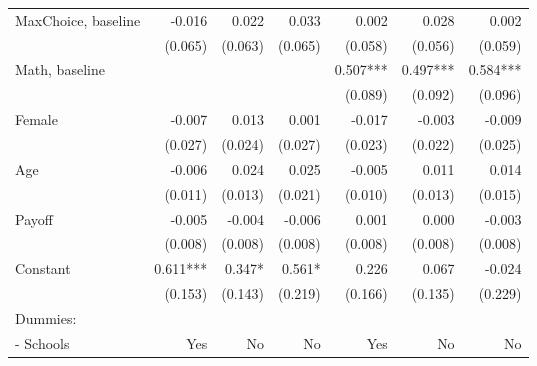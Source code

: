 \begin{table}[!h]
\begin{adjustbox}{width=1\textwidth}
\begin{threeparttable}
\begin{tabular}{l*{6}{D{.}{.}{-1}}}
\midrule
MaxChoice, baseline &              -0.016   &               0.022   &               0.033   &               0.002   &               0.028   &               0.002   \\
                    &             (0.065)   &             (0.063)   &             (0.065)   &             (0.058)   &             (0.056)   &             (0.059)   \\
Math, baseline      &                       &                       &                       &               0.507***&               0.497***&               0.584***\\
                    &                       &                       &                       &             (0.089)   &             (0.092)   &             (0.096)   \\
Female              &              -0.007   &               0.013   &               0.001   &              -0.017   &              -0.003   &              -0.009   \\
                    &             (0.027)   &             (0.024)   &             (0.027)   &             (0.023)   &             (0.022)   &             (0.025)   \\
Age                 &              -0.006   &               0.024   &               0.025   &              -0.005   &               0.011   &               0.014   \\
                    &             (0.011)   &             (0.013)   &             (0.021)   &             (0.010)   &             (0.013)   &             (0.015)   \\
Payoff              &              -0.005   &              -0.004   &              -0.006   &               0.001   &               0.000   &              -0.003   \\
                    &             (0.008)   &             (0.008)   &             (0.008)   &             (0.008)   &             (0.008)   &             (0.008)   \\
Constant            &               0.611***&               0.347*  &               0.561*  &               0.226   &               0.067   &              -0.024   \\
                    &             (0.153)   &             (0.143)   &             (0.219)   &             (0.166)   &             (0.135)   &             (0.229)   \\ \midrule
Dummies: &&&&& \\                    
- Schools             &                 Yes   &                  No   &                  No   &                 Yes   &                  No   &                  No   \\

\end{tabular}
\end{threeparttable}
\end{adjustbox}
\end{table}
